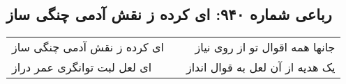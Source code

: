 \begin{center}
\section*{رباعی شماره ۹۴۰: ای کرده ز نقش آدمی چنگی ساز}
\label{sec:0940}
\begin{longtable}{l p{0.5cm} r}
ای کرده ز نقش آدمی چنگی ساز
&&
جانها همه اقوال تو از روی نیاز
\\
ای لعل لبت توانگری عمر دراز
&&
یک هدیه از آن لعل به قوال انداز
\\
\end{longtable}
\end{center}
